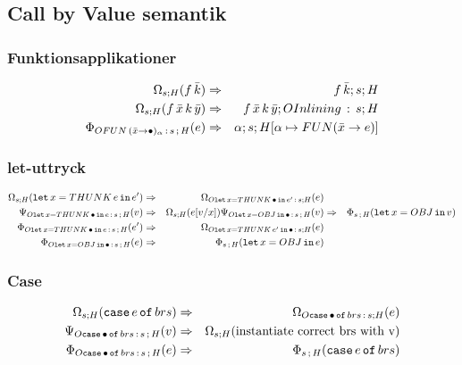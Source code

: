 \documentclass[../Optimise]{subfiles}
\begin{document}

\subsection{Call by Value semantik}


\subsubsection{Funktionsapplikationer}

\begin{align}
\OMEGA sH{f\,\bar{k}} & \Rightarrow & \mc{f\,\bar{k}}sH\\
\OMEGA sH{f\,\bar{x}\, k\,\bar{y}} & \Rightarrow & \mc{f\,\bar{x}\, k\,\bar{y}}{\oInline s}H\\
\IRR{\cOFUN{\bar{x}}{\alpha}s}He & \Rightarrow & \mc{\alpha}s{\heap{\alpha}{\FUN{\bar{x}}e}}
\end{align}

\subsubsection{let-uttryck}

\begin{align}
\OMEGA sH{\eLet x{\THUNK e}{e'}} & \Rightarrow & \OMEGA{\oLet x{e'}s}He\\
\PSI{\oLet xes}Hv & \Rightarrow & \OMEGA sH{e[v/x]}
\PSI{\oLetObj x{OBJ}s}Hv & \Rightarrow & \IRR sH{\eLet x{OBJ}v}\\
\IRR{\oLet xes}H{e'} & \Rightarrow & \OMEGA{\oLetObj x{\THUNK{e'}}s}He\\
\IRR{\oLetObj x{OBJ}s}He & \Rightarrow & \IRR sH{\eLet x{OBJ}e}
\end{align}

\subsubsection{Case}
\begin{align}
\OMEGA sH{\eCase e{brs}} & \Rightarrow & \OMEGA{\oCase{brs}s}He\\
\label{CBV:Case2} \PSI{\oCase{brs}s}Hv & \Rightarrow & \OMEGA sH{\text{instantiate correct brs with v}} \\
\label{CBV:Case3} \IRR{\oCase{brs}s}He & \Rightarrow & \IRR sH{\eCase e brs}
\end{align}
\end{document}
